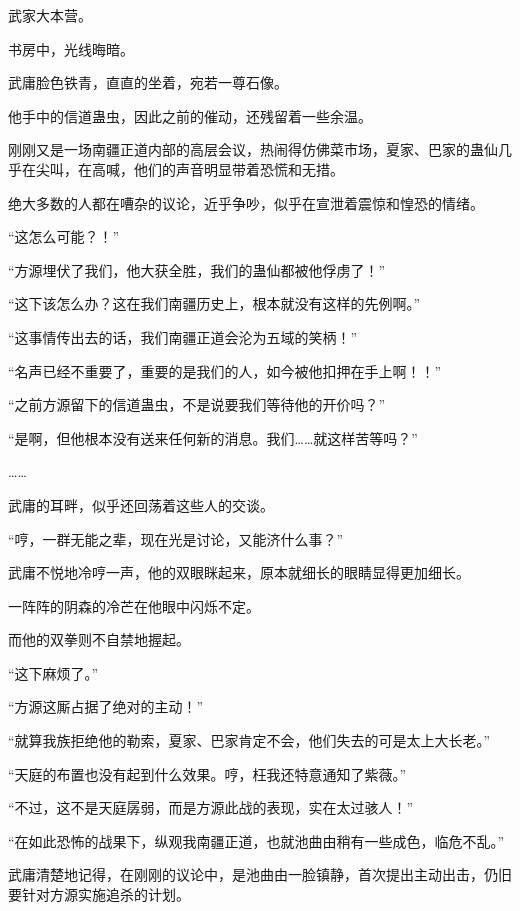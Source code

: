 
\begin{this_body}



武家大本营。

书房中，光线晦暗。

武庸脸色铁青，直直的坐着，宛若一尊石像。

他手中的信道蛊虫，因此之前的催动，还残留着一些余温。

刚刚又是一场南疆正道内部的高层会议，热闹得仿佛菜市场，夏家、巴家的蛊仙几乎在尖叫，在高喊，他们的声音明显带着恐慌和无措。

绝大多数的人都在嘈杂的议论，近乎争吵，似乎在宣泄着震惊和惶恐的情绪。

“这怎么可能？！”

“方源埋伏了我们，他大获全胜，我们的蛊仙都被他俘虏了！”

“这下该怎么办？这在我们南疆历史上，根本就没有这样的先例啊。”

“这事情传出去的话，我们南疆正道会沦为五域的笑柄！”

“名声已经不重要了，重要的是我们的人，如今被他扣押在手上啊！！”

“之前方源留下的信道蛊虫，不是说要我们等待他的开价吗？”

“是啊，但他根本没有送来任何新的消息。我们……就这样苦等吗？”

……

武庸的耳畔，似乎还回荡着这些人的交谈。

“哼，一群无能之辈，现在光是讨论，又能济什么事？”

武庸不悦地冷哼一声，他的双眼眯起来，原本就细长的眼睛显得更加细长。

一阵阵的阴森的冷芒在他眼中闪烁不定。

而他的双拳则不自禁地握起。

“这下麻烦了。”

“方源这厮占据了绝对的主动！”

“就算我族拒绝他的勒索，夏家、巴家肯定不会，他们失去的可是太上大长老。”

“天庭的布置也没有起到什么效果。哼，枉我还特意通知了紫薇。”

“不过，这不是天庭孱弱，而是方源此战的表现，实在太过骇人！”

“在如此恐怖的战果下，纵观我南疆正道，也就池曲由稍有一些成色，临危不乱。”

武庸清楚地记得，在刚刚的议论中，是池曲由一脸镇静，首次提出主动出击，仍旧要针对方源实施追杀的计划。


\end{this_body}

